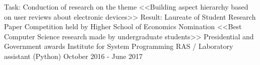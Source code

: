 \begin{cventries}

\cventry
{Task: Conduction of research on the theme <<Building aspect hierarchy based on user reviews about electronic devices>>
		\newline Result: Laureate of Student Research Paper Competition held by Higher School of Economics
		\newline Nomination <<Best Computer Science research made by undergraduate students>>
		\newline Presidential and Government awards
		\newline
	} %
{Institute for System Programming RAS / Laboratory assistant (Python)} %
{} %
{October 2016 - June 2017} %
\noindent	



\end{cventries}